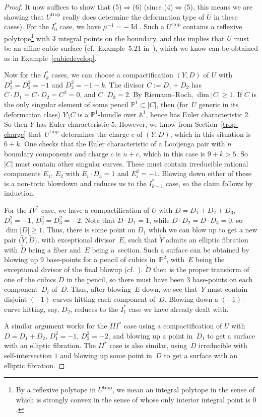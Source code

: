 \documentclass[pdftex]{sigma}
\numberwithin{equation}{section}
\numberwithin{figure}{section}
\numberwithin{table}{section}
\DeclareMathOperator{\Id}{Id}
\DeclareMathOperator{\trop}{trop}
\let\?=\overline
\let\bb=\mathbb
\let\wt=\widetilde
\theoremstyle{definition}
\begin{document}
\begin{proof}
It now suffices to show that (5)$\Rightarrow$(6) (since (4)$\Leftrightarrow$(5), this means we are showing that $U^{\trop}$ really does determine the deformation type of $U$ in these cases). For the $I_0^*$ case, we have $\mu^{-1}=-\Id$. Such a $U^{\trop}$ contains a reflexive polytope\footnote{By a reflexive polytope in $U^{\trop}$, we mean an integral polytope in the sense of \cite[Definition~2.10]{Man1} which is strongly convex in the sense of \cite[Definition~5.4]{Man1} whose only interior integral point is $0$.} with $3$ integral points on the boundary, and this implies that $U$ must be an affine cubic surface (cf.\ Example~5.21 in~\cite{Man1}), which we know can be obtained as in Example~\ref{cubicdevelop}.

Now for the $I_k^*$ cases, we can choose a compactification $(Y,D)$ of $U$ with $D_1^2=D_2^2=-1$ and $D_3^2=-1-k$. The divisor $C:=D_1+D_2$ has $C\cdot D_1=C\cdot D_2 = C^2 = 0$, and $C\cdot D_3 = 2$. By Riemann--Roch, $\dim |C|\geq 1$. If $C$ is the only singular element of some pencil $\bb{P}^1\subset |C|$, then (for~$U$ generic in its deformation class) $Y\setminus C$ is a $\bb{P}^1$-bundle over $\bb{A}^1$, hence has Euler characteristic $2$. So then $Y$ has Euler characteristic $5$. However, we know from Section~\ref{trop-charge} that~$U^{\trop}$ determines the charge $c$ of $(Y,D)$, which in this situation is $6+k$. One checks that the Euler characteristic of a Looijenga pair with $n$ boundary components and charge $c$ is $n+c$, which in this case is $9+k > 5$. So $|C|$ must contain other singular curves. These must contain irreducible rational components $E_1$, $E_2$ with $E_i\cdot D_3 = 1$ and $E_i^2=-1$. Blowing down either of these is a non-toric blowdown and reduces us to the $I_{k-1}^*$ case, so the claim follows by induction.

For the $IV^*$ case, we have a compactification of $U$ with $D=D_1+D_2+D_3$, $D_1^2=-1$, $D_2^2=D_3^2 = -2$. Note that $D\cdot D_1=1$, while $D\cdot D_2=D\cdot D_3 = 0$, so $\dim |D|\geq 1$. Thus, there is some point on $D_1$ which we can blow up to get a new pair $\big(\wt{Y},\wt{D}\big)$, with exceptional divisor~$E$, such that $\wt{Y}$ admits an elliptic fibration with $\wt{D}$ being a fiber and~$E$ being a~section. Such a surface can be obtained by blowing up $9$ base-points for a pencil of cubics in~$\bb{P}^2$, with~$E$ being the exceptional divisor of the final blowup (cf.~\cite{HL}). $\wt{D}$ then is the proper transform of one of the cubics $\?{D}$ in the pencil, so there must have been $3$ base-points on each component~$\?{D}_i$ of~$\?{D}$. Thus, after blowing~$E$ down, we see that~$Y$ must contain disjoint $(-1)$-curves hitting each component of~$D$. Blowing down a $(-1)$-curve hitting, say, $D_2$, reduces to the $I_1^*$ case we have already dealt with.

A similar argument works for the $III^*$ case using a compactification of $U$ with $D=D_1+D_2$, $D_1^2=-1$, $D_2^2 = -2$, and blowing up a point in~$D_1$ to get a surface with an elliptic fibration. The $II^*$ case is also similar, using~$D$ irreducible with self-intersection $1$ and blowing up some point in~$D$ to get a surface with an elliptic fibration.
\end{proof}
\end{document}
